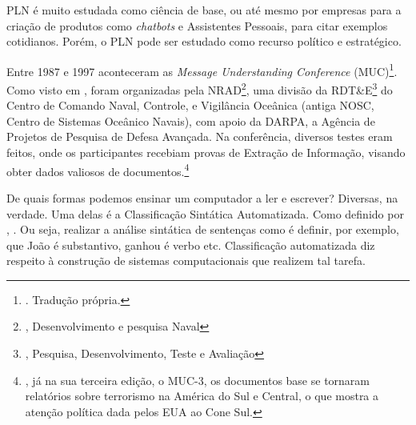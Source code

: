 PLN é muito estudada como ciência de base, ou até mesmo por empresas para a criação de produtos como \textit{chatbots} e Assistentes Pessoais, para citar exemplos cotidianos. Porém, o PLN pode ser estudado como recurso político e estratégico.

Entre 1987 e 1997 aconteceram as \textit{Message Understanding Conference} (MUC)\footnote{. Tradução própria.}. Como visto em \cite[p~466]{Grishman1996MUC}, foram organizadas pela NRAD\footnote{, Desenvolvimento e pesquisa Naval}, uma divisão da RDT\&E\footnote{, Pesquisa, Desenvolvimento, Teste e Avaliação} do Centro de Comando Naval, Controle, e Vigilância Oceânica (antiga NOSC, Centro de Sistemas Oceânico Navais), com apoio da DARPA, a Agência de Projetos de Pesquisa de Defesa Avançada. Na conferência, diversos testes eram feitos, onde os participantes recebiam provas de Extração de Informação, visando obter dados valiosos de documentos.\footnote{, já na sua terceira edição, o MUC-3, os documentos base se tornaram relatórios sobre terrorismo na América do Sul e Central, o que mostra a atenção política dada pelos EUA ao Cone Sul.}

De quais formas podemos ensinar um computador a ler e escrever? Diversas, na verdade. Uma delas é a Classificação Sintática Automatizada. Como definido por , .
Ou seja, realizar a análise sintática de sentenças como  é definir, por exemplo, que João é substantivo, ganhou é verbo etc. Classificação automatizada diz respeito à construção de sistemas computacionais que realizem tal tarefa.

